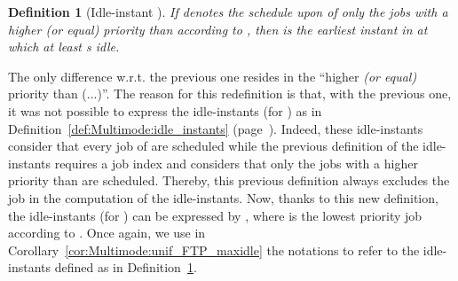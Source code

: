 \documentclass{article}
\newtheorem{Definition}{Definition}
\newtheorem{validity test}{Validity Test}
\begin{document}
\begin{Definition}[Idle-instant ]
\label{def:Multimode:unif_FTP_idle_ij_redefined}
If  denotes the schedule upon  of only the jobs with a higher (or equal) priority than  according to , then  is the earliest instant in  at which at least  s idle. 
\end{Definition}

The only difference w.r.t. the previous one resides in the ``higher \emph{(or equal)} priority than (...)''. The reason for this redefinition is that, with the previous one, it was not possible to express the idle-instants  (for ) as in Definition~\ref{def:Multimode:idle_instants} (page~\pageref{def:Multimode:idle_instants}). Indeed, these idle-instants  consider that every job of  are scheduled while the previous definition of the idle-instants  requires a job index  and considers that only the jobs with a higher priority than  are scheduled. Thereby, this previous definition always excludes the job  in the computation of the idle-instants. Now, thanks to this new definition, the idle-instants  (for ) can be expressed by , where  is the lowest priority job according to . Once again, we use in Corollary~\ref{cor:Multimode:unif_FTP_maxidle} the notations  to refer to the idle-instants  defined as in Definition~\ref{def:Multimode:unif_FTP_idle_ij_redefined}. 
\end{document}
